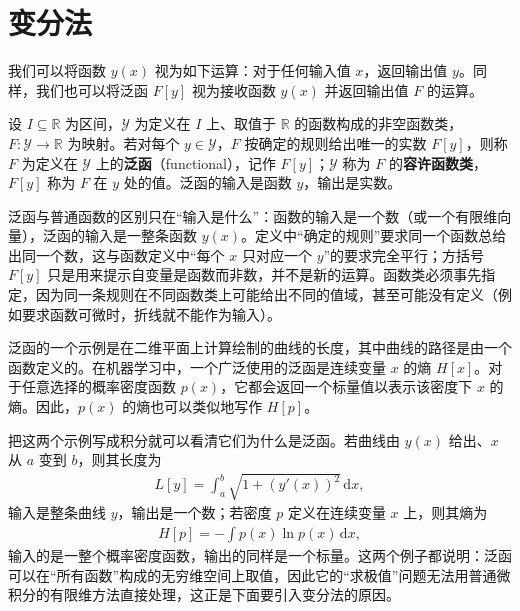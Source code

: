 \documentclass[../main.tex]{subfiles}
\begin{document}

\chapter{变分法}\label{chapter:appB-变分法}

我们可以将函数 $y(x)$ 视为如下运算：对于任何输入值 $x$，返回输出值 $y$。同样，我们也可以将泛函 $F[y]$ 视为接收函数 $y(x)$ 并返回输出值 $F$ 的运算。

\begin{definition}[泛函]\label{definition:appB-泛函}
设 $I\subseteq\mathbb{R}$ 为区间，$\mathcal{Y}$ 为定义在 $I$ 上、取值于 $\mathbb{R}$ 的函数构成的非空函数类，$F:\mathcal{Y}\to\mathbb{R}$ 为映射。若对每个 $y\in\mathcal{Y}$，$F$ 按确定的规则给出唯一的实数 $F[y]$，则称 $F$ 为定义在 $\mathcal{Y}$ 上的\textbf{泛函}（functional），记作 $F[y]$；$\mathcal{Y}$ 称为 $F$ 的\textbf{容许函数类}，$F[y]$ 称为 $F$ 在 $y$ 处的值。泛函的输入是函数 $y$，输出是实数。
\end{definition}

\begin{remark}
泛函与普通函数的区别只在“输入是什么”：函数的输入是一个数（或一个有限维向量），泛函的输入是一整条函数 $y(x)$。定义中“确定的规则”要求同一个函数总给出同一个数，这与函数定义中“每个 $x$ 只对应一个 $y$”的要求完全平行；方括号 $F[y]$ 只是用来提示自变量是函数而非数，并不是新的运算。函数类必须事先指定，因为同一条规则在不同函数类上可能给出不同的值域，甚至可能没有定义（例如要求函数可微时，折线就不能作为输入）。
\end{remark}

泛函的一个示例是在二维平面上计算绘制的曲线的长度，其中曲线的路径是由一个函数定义的。在机器学习中，一个广泛使用的泛函是连续变量 $x$ 的熵 $H[x]$。对于任意选择的概率密度函数 $p(x)$，它都会返回一个标量值以表示该密度下 $x$ 的熵。因此，$p(x)$ 的熵也可以类似地写作 $H[p]$。

\begin{remark}
把这两个示例写成积分就可以看清它们为什么是泛函。若曲线由 $y(x)$ 给出、$x$ 从 $a$ 变到 $b$，则其长度为
\begin{align*}
  L[y]=\int_{a}^{b}\sqrt{1+(y'(x))^{2}}\,\mathrm{d}x,
\end{align*}
输入是整条曲线 $y$，输出是一个数；若密度 $p$ 定义在连续变量 $x$ 上，则其熵为
\begin{align*}
  H[p]=-\int p(x)\ln p(x)\,\mathrm{d}x,
\end{align*}
输入的是一整个概率密度函数，输出的同样是一个标量。这两个例子都说明：泛函可以在“所有函数”构成的无穷维空间上取值，因此它的“求极值”问题无法用普通微积分的有限维方法直接处理，这正是下面要引入变分法的原因。
\end{remark}
\end{document}
